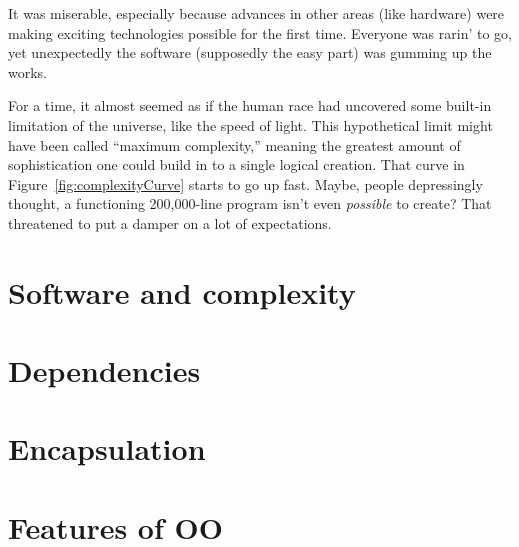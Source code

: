It was miserable, especially because advances in other areas (like hardware)
were making exciting technologies possible for the first time. Everyone was
rarin' to go, yet unexpectedly the software (supposedly the easy part) was
gumming up the works.

For a time, it almost seemed as if the human race had uncovered some built-in
limitation of the universe, like the speed of light. This hypothetical limit
might have been called ``maximum complexity,'' meaning the greatest amount of
sophistication one could build in to a single logical creation. That curve in
Figure~\ref{fig:complexityCurve} starts to go up fast. Maybe, people
depressingly thought, a functioning 200,000-line program isn't even
\textit{possible} to create? That threatened to put a damper on a lot of
expectations.

\section{Software and complexity}




\section{Dependencies}

\section{Encapsulation}

\section{Features of OO}

% 
% 
% 
